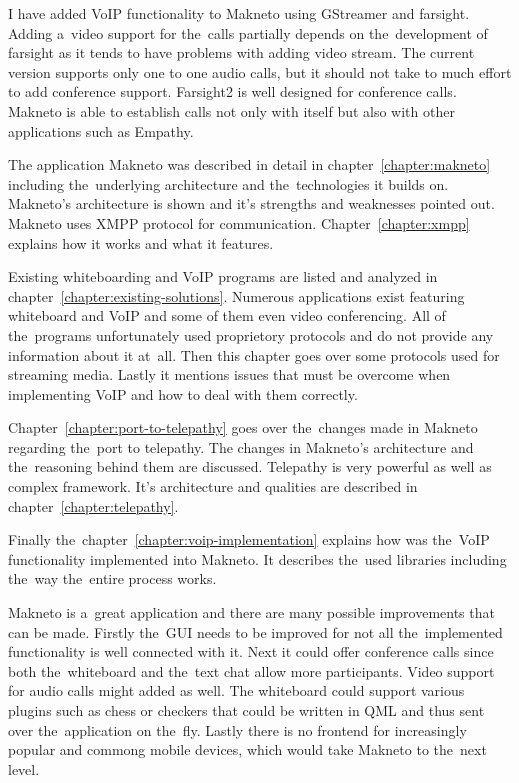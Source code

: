 I have added VoIP functionality to Makneto using GStreamer and farsight. Adding a~video support for the~calls partially depends on the~development of farsight as it tends to have problems with adding video stream. The current version supports only one to one audio calls, but it should not take to much effort to add conference support. Farsight2 is well designed for conference calls. Makneto is able to establish calls not only with itself but also with other applications such as Empathy. 

The application Makneto was described in detail in chapter~\ref{chapter:makneto} including the~underlying architecture and the~technologies it builds on. Makneto's architecture is shown and it's strengths and weaknesses pointed out. Makneto uses XMPP protocol for communication. Chapter~\ref{chapter:xmpp} explains how it works and what it features.

Existing whiteboarding and VoIP programs are listed and analyzed in chapter~\ref{chapter:existing-solutions}. Numerous applications exist featuring whiteboard and VoIP and some of them even video conferencing. All of the~programs unfortunately used proprietory protocols and do not provide any information about it at~all. Then this chapter goes over some protocols used for streaming media. Lastly it mentions issues that must be overcome when implementing VoIP and how to deal with them correctly. 

Chapter~\ref{chapter:port-to-telepathy} goes over the~changes made in Makneto regarding the~port to telepathy. The changes in Makneto's architecture and the~reasoning behind them are discussed. Telepathy is very powerful as well as complex framework. It's architecture and qualities are described in chapter~\ref{chapter:telepathy}. 

Finally the~chapter~\ref{chapter:voip-implementation} explains how was the~VoIP functionality implemented into Makneto. It describes the~used libraries 
including the~way the~entire process works.

Makneto is a~great application and there are many possible improvements that can be made. Firstly the~GUI needs to be improved for not all the~implemented functionality is well connected with it. Next it could offer conference calls since both the~whiteboard and the~text chat allow more participants. Video support for audio calls might added as well. The whiteboard could support various plugins such as chess or checkers that could be written in QML and thus sent over the~application on the~fly. Lastly there is no frontend for increasingly popular and commong mobile devices, which would take Makneto to the~next level.
